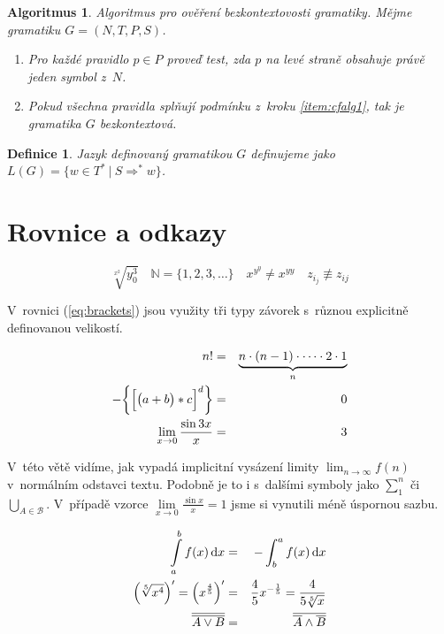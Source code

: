 \documentclass[10pt]{proc}
\theoremstyle{ity}
\newtheorem{thdef}[subsection]{Definice}
\newtheorem{thalg}[subsection]{Algoritmus}
\begin{document}
\begin{thalg}
	Algoritmus pro ověření bezkontextovosti gramatiky.
	Mějme gramatiku $G = (N, T, P, S)$.
	\begin{enumerate}
		\item \label{item:cfalg1} Pro každé pravidlo $p \in P$ proveď test, zda $p$ na levé straně obsahuje
			právě jeden symbol z~$N$.
		\item Pokud všechna pravidla splňují podmínku z~kroku \ref{item:cfalg1}, tak je gramatika $G$
			bezkontextová.
	\end{enumerate}
\end{thalg}

\begin{thdef}
	\emph{Jazyk} definovaný gramatikou $G$ definujeme jako $L(G) = \{w \in T^{*}\ |\ S \Rightarrow^{*} w \}$.
\end{thdef}

\section{Rovnice a odkazy}

$$\sqrt[x^{2}]{y_{0}^{3}} \quad \mathbb{N} = \{1, 2, 3, \dots\} \quad x^{y^{y}} \neq x^{yy} \quad z_{i_{j}}
\not\equiv z_{ij}$$

V~rovnici (\ref{eq:brackets}) jsou využity tři typy závorek s~různou explicitně definovanou velikostí.

\begin{eqnarray}
	\label{eq:factorial} n! & = & \underbrace{n \cdot (n - 1) \cdot \cdots \cdot 2 \cdot 1}_{n} \\
	\label{eq:brackets} - \biggl{\{}\Bigl{[}\bigl{(}a + b\bigr{)} * c\Bigr{]}^{d}\biggr{\}} & = & 0 \\
	\lim_{x \rightarrow 0}\frac{\sin{3x}}{x} & = & 3 \nonumber
\end{eqnarray}

V~této větě vidíme, jak vypadá implicitní vysázení limity $\lim_{n \rightarrow \infty}f(n)$ v~normálním
odstavci textu. Podobně je to i s~dalšími symboly jako $\sum_{1}^{n}$ či $\bigcup_{A \in \mathcal{B}}$.
V~případě vzorce $\lim\limits_{x \rightarrow 0}\frac{\sin{x}}{x} = 1$ jsme si vynutili méně úspornou sazbu.

\begin{eqnarray}
	\int\limits_{a}^{b}f(x)\,\mathrm{d}x & = & - \int_{b}^{a}f(x)\,\mathrm{d}x \\
	\Bigl{(}\sqrt[5]{x^{4}}\Bigr{)}' = \Bigl{(}x^{\frac{4}{5}}\Bigr{)}' & = & \frac{4}{5}x^{-\frac{1}{5}}
		= \frac{4}{5\sqrt[5]{x}} \\
	\overline{\overline{A \vee B}} & = & \overline{\overline{A} \wedge \overline{B}}
\end{eqnarray}
\end{document}

